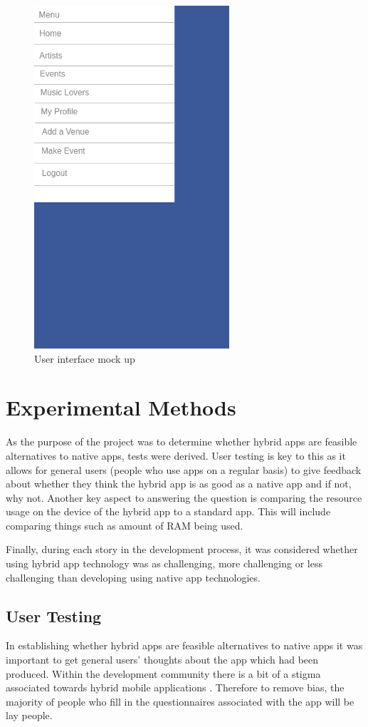 \begin{center}
\begin{figure}[H]
\includegraphics[scale=0.5]{images/ui3}
\caption{User interface mock up}
\end{figure}
\end{center}

\section{Experimental Methods}
As the purpose of the project was to determine whether hybrid apps are feasible alternatives to native apps, tests were derived. User testing is key to this as it allows for general users (people who use apps on a regular basis) to give feedback about whether they think the hybrid app is as good as a native app and if not, why not. Another key aspect to answering the question is comparing the resource usage on the device of the hybrid app to a standard app. This will include comparing things such as amount of RAM being used.

Finally, during each story in the development process, it was considered whether using hybrid app technology was as challenging, more challenging or less challenging than developing using native app technologies.

\subsection{User Testing}
In establishing whether hybrid apps are feasible alternatives to native apps it was important to get general users' thoughts about the app which had been produced. Within the development community there is a bit of a stigma associated towards hybrid mobile applications \cite{hybridcrap}. Therefore to remove bias, the majority of people who fill in the questionnaires associated with the app will be lay people.

